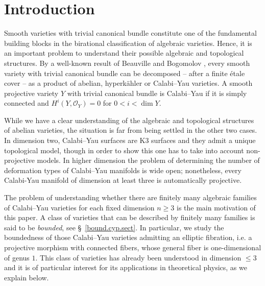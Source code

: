 \documentclass{amsart}[12pt,a4paper]
\theoremstyle{definition}
\begin{document}

\maketitle


\section{Introduction}
Smooth varieties with trivial canonical bundle constitute one of the fundamental building blocks in the birational classification of algebraic varieties.
Hence, it is an important problem to understand their possible algebraic and topological structures. 
By a well-known result of Beauville and Bogomolov \cite{MR730926}, 
every smooth variety with trivial canonical bundle can be decomposed -- after a finite \'etale cover -- as a product of abelian, hyperk\"ahler or Calabi--Yau varieties. 
A smooth projective variety $Y$ with trivial canonical bundle is Calabi--Yau if it is simply connected and $H^i(Y, \mathcal{O}_Y)=0$ for $0<i<\dim Y$.

While we have a clear understanding of the algebraic and topological structures of abelian varieties, the situation is far from being settled in the other two cases.
In dimension two, Calabi--Yau surfaces are K3 surfaces and they admit a unique topological model, though in order to show this one has to take into account non-projective models. 
In higher dimension the problem of determining the number of
deformation types of Calabi--Yau manifolds is wide open;
nonetheless, every Calabi-Yau manifold of dimension at least three is automatically projective.

The problem of understanding whether there are finitely many algebraic families of Calabi--Yau varieties for each fixed dimension $n\geq 3$ is the main motivation of this paper.
A class of varieties that can be described by finitely many families is said to be {\it bounded}, see \S~\ref{bound.cyp.sect}.
In particular, we study the boundedness of those Calabi--Yau varieties admitting an elliptic fibration, i.e. a projective morphism with connected fibers, whose general fiber is one-dimensional of genus $1$.
This class of varieties has already been understood in dimension $\leq 3$ and it is of particular interest for its applications in theoretical physics, as we explain below.
\end{document}
